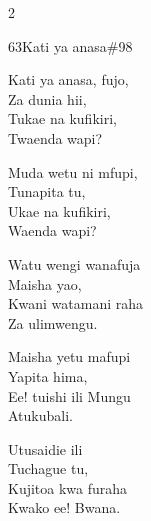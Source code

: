\documentclass{article}
\begin{document}
\begin{multicols}{2}
\begin{hymn}{63}{Kati ya anasa}{\#98}
\begin{stanza}
Kati ya anasa, fujo,\\
Za dunia hii,\\
Tukae na kufikiri,\\
Twaenda wapi?
\end{stanza}
\begin{chorus}
Muda wetu ni mfupi,\\
Tunapita tu,\\
Ukae na kufikiri,\\
Waenda wapi?
\end{chorus}
\begin{stanza}
Watu wengi wanafuja\\
Maisha yao,\\
Kwani watamani raha\\
Za ulimwengu.
\end{stanza}
\begin{stanza}
Maisha yetu mafupi\\
Yapita hima,\\
Ee! tuishi ili Mungu\\
Atukubali.
\end{stanza}
\begin{stanza}
Utusaidie ili\\
Tuchague tu,\\
Kujitoa kwa furaha\\
Kwako ee! Bwana.
\end{stanza}
\end{hymn}


\end{multicols}
\end{document}

